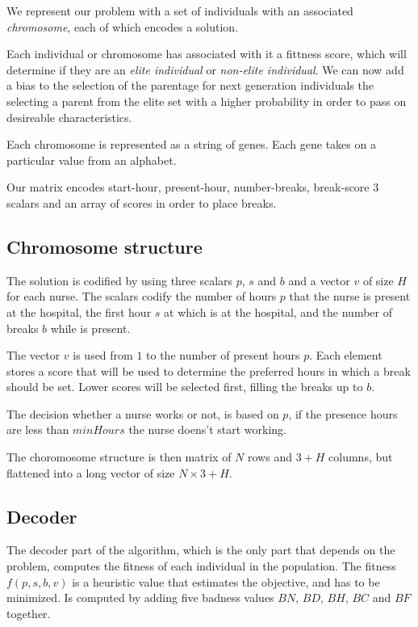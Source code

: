 \documentclass[12pt,a4paper]{article}
\begin{document}
We represent our problem with a set of individuals with an associated
\textit{chromosome}, each of which encodes a solution.

Each individual or chromosome has associated with it a fittness score, which
will determine if they are an \textit{elite individual} or \textit{non-elite
individual}. We can now add a bias to the selection of the parentage for next
generation individuals the selecting a parent from the elite set with a higher
probability in order to pass on desireable characteristics.

Each chromosome is represented as a string of genes. Each gene takes on a
particular value from an alphabet.

Our matrix encodes start-hour, present-hour, number-breaks, break-score
3 scalars and an array of scores in order to place breaks.


\subsection{Chromosome structure}

The solution is codified by using three scalars $p$, $s$ and $b$ and a vector
$v$ of size $H$ for each nurse. The scalars codify the number of hours $p$ that
the nurse is present at the hospital, the first hour $s$ at which is at the
hospital, and the number of breaks $b$ while is present.

The vector $v$ is used from $1$ to the number of present hours $p$. Each element
stores a score that will be used to determine the preferred hours in which a
break should be set. Lower scores will be selected first, filling the breaks up
to $b$.

The decision whether a nurse works or not, is based on $p$, if the presence
hours are less than $minHours$ the nurse doens't start working.

The choromosome structure is then matrix of $N$ rows and $3+H$ columns, but
flattened into a long vector of size $N \times 3+H$.

\subsection{Decoder}

The decoder part of the algorithm, which is the only part that depends on the 
problem, computes the fitness of each individual in the population. The fitness 
$f(p,s,b,v)$ is a heuristic value that estimates the objective, and has to be 
minimized. Is computed by adding five badness values $BN$, $BD$, $BH$, $BC$ and 
$BF$ together.
\end{document}
